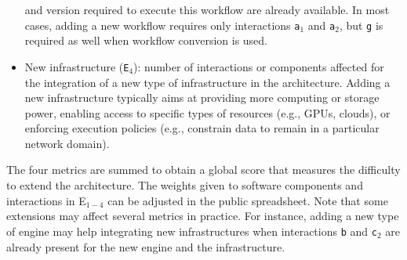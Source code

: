 \documentclass[preprint,3p,twocolumn]{elsarticle}
\newcommand{\todo}[2]{\pdfmargincomment[color=red,author=#1,open=true]{#2}}
\newcommand{\correction}[1]{\color{blue}#1\color{black}\xspace}
\begin{document}
\begin{itemize}[leftmargin=0cm,itemindent=0.35cm,itemsep=0cm]
  and version required to execute this workflow are already
  available. In most cases, adding a new workflow requires only
  interactions \texttt{a$_1$} and \texttt{a$_2$}, but \texttt{g}
  is required as well when workflow conversion is used. 
\item New infrastructure (\texttt{E$_4$}): number of interactions or
  components affected for the integration of a new type of infrastructure in
  the architecture. Adding a new infrastructure typically aims at providing more
  computing or storage power, enabling access to specific types of resources
  (e.g., GPUs, clouds), or  enforcing execution policies (e.g.,
  constrain data to remain in a particular network domain).
\end{itemize}
The four metrics are summed to obtain a global score that measures the
difficulty to extend the architecture. \correction{The weights given to software components and interactions in E$_{1-4}$ can be adjusted in the public spreadsheet.} 
Note that some extensions may
affect several metrics in practice. For instance, adding a new type
of engine may help integrating new infrastructures when interactions
\texttt{b} and \texttt{c$_2$} are already present for the new engine
and the infrastructure.
\end{document}
